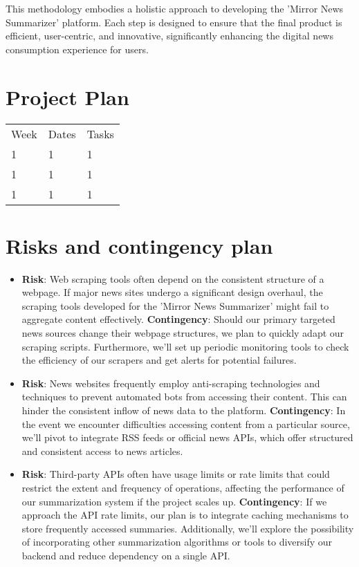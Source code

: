 \documentclass[a4paper]{article}
\begin{document}
This methodology embodies a holistic approach to developing the 'Mirror News Summarizer' platform. Each step is designed to ensure that the final product is efficient, user-centric, and innovative, significantly enhancing the digital news consumption experience for users.

\section{Project Plan}

\begin{table}
    \centering
    \begin{tabular}{lll}
        Week & Dates & Tasks \\
        1    & 1     & 1     \\
        1    & 1     & 1     \\
        1    & 1     & 1     
    \end{tabular}
\end{table}

\section{Risks and contingency plan}

\begin{itemize}
    \item \textbf{Risk}: Web scraping tools often depend on the consistent structure of a webpage. If major news sites undergo a significant design overhaul, the scraping tools developed for the 'Mirror News Summarizer' might fail to aggregate content effectively.
    \subitem \textbf{Contingency}: Should our primary targeted news sources change their webpage structures, we plan to quickly adapt our scraping scripts. Furthermore, we'll set up periodic monitoring tools to check the efficiency of our scrapers and get alerts for potential failures.
    \item \textbf{Risk}: News websites frequently employ anti-scraping technologies and techniques to prevent automated bots from accessing their content. This can hinder the consistent inflow of news data to the platform.
    \subitem \textbf{Contingency}: In the event we encounter difficulties accessing content from a particular source, we'll pivot to integrate RSS feeds or official news APIs, which offer structured and consistent access to news articles.
    \item \textbf{Risk}: Third-party APIs often have usage limits or rate limits that could restrict the extent and frequency of operations, affecting the performance of our summarization system if the project scales up.
    \subitem \textbf{Contingency}: If we approach the API rate limits, our plan is to integrate caching mechanisms to store frequently accessed summaries. Additionally, we'll explore the possibility of incorporating other summarization algorithms or tools to diversify our backend and reduce dependency on a single API.
\end{itemize}
\end{document}
